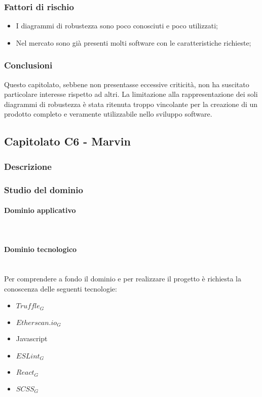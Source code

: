 		\subsubsection{Fattori di rischio}
		\begin{itemize}
			\item I diagrammi di robustezza sono poco conosciuti e poco utilizzati;
			\item Nel mercato sono già presenti molti software con le caratteristiche richieste;
		\end{itemize}
		\subsubsection{Conclusioni}
		Questo capitolato, sebbene non presentasse eccessive criticità, non ha suscitato particolare interesse rispetto ad altri. La limitazione alla rappresentazione dei soli diagrammi di robustezza è stata ritenuta troppo vincolante per la creazione di un prodotto completo e veramente utilizzabile nello sviluppo software.
	\subsection{Capitolato C6 - Marvin}
		\subsubsection{Descrizione}
		\subsubsection{Studio del dominio}
			\paragraph{Dominio applicativo}
			\mbox{}\\
			\paragraph{Dominio tecnologico}
			\mbox{}\\
			Per comprendere a fondo il dominio e per realizzare il progetto è richiesta la conoscenza delle seguenti tecnologie:
			\begin{itemize}
				\item $Truffle_G$
				\item $Etherscan.io_G$
				\item Javascript
				\item $ESLint_G$
				\item $React_G$
				\item $SCSS_G$
			\end{itemize}
